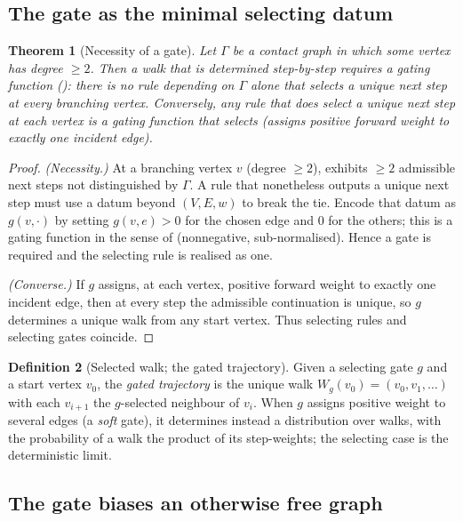 \documentclass[11pt,a4paper]{article}
\theoremstyle{thmstyle}
\newtheorem{theorem}{Theorem}[section]
\theoremstyle{definition}
\newtheorem{definition}[theorem]{Definition}
\theoremstyle{remark}
\newcommand{\Gph}{\Gamma}                 %
\newcommand{\V}{V}                        %
\newcommand{\E}{E}                        %
\newcommand{\wt}{w}                       %
\newcommand{\Walk}{W}                     %
\newcommand{\gate}{g}                     %
\begin{document}
\subsection{The gate as the minimal selecting datum}

\begin{theorem}[Necessity of a gate]
\label{thm:gate-necessary}
Let $\Gph$ be a contact graph in which some vertex has degree $\ge2$. Then a walk
that is determined step-by-step requires a gating function
\textup{(}\textup{)}: there is no rule depending on $\Gph$ alone
that selects a unique next step at every branching vertex. Conversely, any rule
that does select a unique next step at each vertex \emph{is} a gating function
that selects \textup{(}assigns positive forward weight to exactly one incident
edge\textup{)}.
\end{theorem}

\begin{proof}
\emph{(Necessity.)} At a branching vertex $v$ (degree $\ge2$), 
exhibits $\ge2$ admissible next steps not distinguished by $\Gph$. A rule that
nonetheless outputs a unique next step must use a datum beyond $(\V,\E,\wt)$ to
break the tie. Encode that datum as $\gate(v,\cdot)$ by setting
$\gate(v,e)>0$ for the chosen edge and $0$ for the others; this is a gating
function in the sense of  (nonnegative, sub-normalised). Hence a
gate is required and the selecting rule is realised as one.

\emph{(Converse.)} If $\gate$ assigns, at each vertex, positive forward weight to
exactly one incident edge, then at every step the admissible continuation is
unique, so $\gate$ determines a unique walk from any start vertex. Thus selecting
rules and selecting gates coincide.
\end{proof}

\begin{definition}[Selected walk; the gated trajectory]
\label{def:gated-walk}
Given a selecting gate $\gate$ and a start vertex $v_0$, the \emph{gated
trajectory} is the unique walk $\Walk_\gate(v_0)=(v_0,v_1,\dots)$ with each
$v_{i+1}$ the $\gate$-selected neighbour of $v_i$. When $\gate$ assigns positive
weight to several edges \textup{(}a \emph{soft} gate\textup{)}, it determines
instead a distribution over walks, with the probability of a walk the product of
its step-weights; the selecting case is the deterministic limit.
\end{definition}

\subsection{The gate biases an otherwise free graph}
\end{document}
